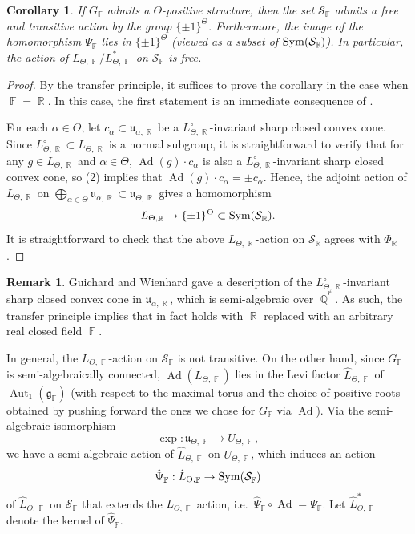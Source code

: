 \documentclass{amsart}
\theoremstyle{plain}
\newtheorem{corollary}[proposition]{Corollary}
\theoremstyle{definition}
\newtheorem{remark}[proposition]{Remark}
\DeclareMathOperator{\Aut}{Aut}
\DeclareMathOperator{\Ad}{Ad}
\DeclareMathOperator{\Fb}{{\mathbb{F}}}
\DeclareMathOperator{\Rb}{{\mathbb{R}}}
\DeclareMathOperator{\Qb}{\mathbb{Q}}
\newcommand{\1}{\mathbf{1}}
\begin{document}
\begin{corollary}\label{cor: GW consequences}
If $G_{\Fb}$ admits a $\Theta$-positive structure, then the set $\mathcal S_{\Fb}$ admits a free and transitive action by the group $\{\pm1\}^{\Theta}$. Furthermore, the image of the homomorphism $\Psi_{\Fb}$
lies in $\{\pm1\}^{\Theta}$ (viewed as a subset of ${\rm Sym}(\mathcal S_{\Fb})$). In particular, the action of $L_{\Theta,\Fb}/L_{\Theta,\Fb}^*$ on $\mathcal S_{\Fb}$ is free.
\end{corollary}

\begin{proof}
By the transfer principle, it suffices to prove the corollary in the case when $\Fb=\Rb$. In this case, the first statement is an immediate consequence of . 

For each $\alpha\in\Theta$, let $c_\alpha\subset\mathfrak u_{\alpha,\Rb}$ be a $L_{\Theta,\Rb}^\circ$-invariant sharp closed convex cone. Since $L_{\Theta,\Rb}^\circ\subset L_{\Theta,\Rb}$ is a normal subgroup, it is straightforward to verify that for any $g\in L_{\Theta,\Rb}$ and $\alpha\in\Theta$, $\Ad(g)\cdot c_\alpha$ is also a $L_{\Theta,\Rb}^\circ$-invariant sharp closed convex cone, so (2) implies that $\Ad(g)\cdot c_\alpha=\pm c_\alpha$. Hence, the adjoint action of $L_{\Theta,\Rb}$ on $\bigoplus_{\alpha\in\Theta}\mathfrak u_{\alpha,\Rb}\subset\mathfrak u_{\Theta,\Rb}$ gives a homomorphism 
\[L_{\Theta,\Rb}\to\{\pm1\}^{\Theta}\subset{\rm Sym}(\mathcal S_{\Rb}).\]
It is straightforward to check that the above $L_{\Theta,\Rb}$-action on $\mathcal S_{\Rb}$ agrees with $\Phi_{\Rb}$.
\end{proof}

\begin{remark}
Guichard and Wienhard \cite[Section 5.1]{guichard2025generalizing}  gave a description of the $L_{\Theta,\Rb}^\circ$-invariant sharp closed convex cone in $\mathfrak u_{\alpha,\Rb}$, which is semi-algebraic over $\overline{\Qb}^r$. As such, the transfer principle implies that  in fact holds with $\Rb$ replaced with an arbitrary real closed field $\Fb$.
\end{remark}


In general, the $L_{\Theta,\Fb}$-action on $\mathcal S_{\Fb}$ is not transitive. On the other hand, since $G_{\Fb}$ is semi-algebraically connected, $\Ad(L_{\Theta,\Fb})$ lies in the Levi factor $\hat L_{\Theta,\Fb}$ of $\Aut_1(\mathfrak g_{\Fb})$ (with respect to the maximal torus and the choice of positive roots obtained by pushing forward the ones we chose for $G_{\Fb}$ via $\Ad$). Via the semi-algebraic isomorphism 
\[\exp:\mathfrak u_{\Theta,\Fb}\to U_{\Theta,\Fb},\] 
we have a semi-algebraic action of $\hat L_{\Theta,\Fb}$ on $U_{\Theta,\Fb}$, which induces an action 
\[\hat\Psi_{\Fb}:\hat L_{\Theta,\Fb}\to{\rm Sym}(\mathcal S_{\Fb})\]
of $\hat L_{\Theta,\Fb}$ on $\mathcal S_{\Fb}$ that extends the $L_{\Theta,\Fb}$ action, i.e.\ $\hat\Psi_{\Fb}\circ\Ad=\Psi_{\Fb}$. Let $\hat L_{\Theta,\Fb}^*$ denote the kernel of $\hat\Psi_{\Fb}$. 
\end{document}
